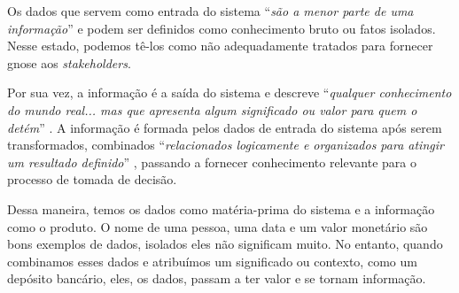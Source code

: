 
Os dados que servem como entrada do sistema \enquote{\textit{são a menor parte de uma informação}} \cite{boscarioli2016mineracao} e podem ser definidos como conhecimento bruto ou fatos isolados. Nesse estado, podemos tê-los como não adequadamente tratados para fornecer gnose aos \textit{stakeholders}.

Por sua vez, a informação é a saída do sistema e descreve \enquote{\textit{qualquer conhecimento do mundo real... mas que apresenta algum significado ou valor para quem o detém}} \cite{boscarioli2016mineracao}. A informação é formada pelos dados de entrada do sistema após serem transformados, combinados \enquote{\textit{relacionados logicamente e organizados para atingir um resultado definido}} \cite{vida2021datawarehouse}, passando a fornecer conhecimento relevante para o processo de tomada de decisão.

Dessa maneira, temos os dados como matéria-prima do sistema e a informação como o produto. O nome de uma pessoa, uma data e um valor monetário são bons exemplos de dados, isolados eles não significam muito. No entanto, quando combinamos esses dados e atribuímos um significado ou contexto, como um depósito bancário, eles, os dados, passam a ter valor e se tornam informação.